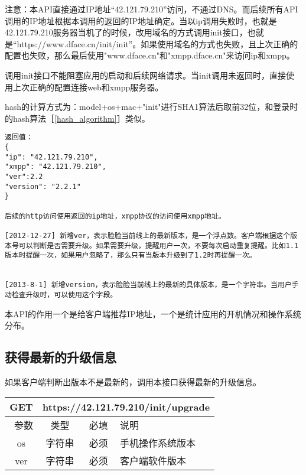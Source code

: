 \documentclass[cs4size]{ctexartutf8}
\begin{document}
注意：本API直接通过IP地址“42.121.79.210”访问，不通过DNS。而后续所有API调用的IP地址根据本调用的返回的IP地址确定。当以ip调用失败时，也就是42.121.79.210服务器当机了的时候，改用域名的方式调用init接口，也就是“https://www.dface.cn/init/init”。如果使用域名的方式也失败，且上次正确的配置也失败，那么最后使用"www.dface.cn"和"xmpp.dface.cn"来访问ip和xmpp。

调用init接口不能阻塞应用的启动和后续网络请求。当init调用未返回时，直接使用上次正确的配置连接web和xmpp服务器。

hash的计算方式为：model+os+mac+"init"进行SHA1算法后取前32位，和登录时的hash算法［\ref{hash_algorithm}］类似。

\begin{verbatim}
返回值：
{
"ip": "42.121.79.210",
"xmpp": "42.121.79.210",
"ver":2.2
"version": "2.2.1"
}

后续的http访问使用返回的ip地址，xmpp协议的访问使用xmpp地址。

[2012-12-27] 新增ver，表示脸脸当前线上的最新版本，是一个浮点数。客户端根据这个版本号可以判断是否需要升级。如果需要升级，提醒用户一次，不要每次启动重复提醒。比如1.1版本时提醒一次，如果用户忽略了，那么只有当版本升级到了1.2时再提醒一次。


[2013-8-1] 新增version，表示脸脸当前线上的最新的具体版本，是一个字符串。当用户手动检查升级时，可以使用这个字段。

\end{verbatim}

本API的作用一个是给客户端推荐IP地址，一个是统计应用的开机情况和操作系统分布。


\subsection{获得最新的升级信息}

如果客户端判断出版本不是最新的，调用本接口获得最新的升级信息。
\begin{table}[H]
   \begin{center}
\begin{tabular}{|c|c|c|p{12cm}|}
\hline
GET & \multicolumn{3}{|c|}{https://42.121.79.210/init/upgrade} \\
\hline\hline
 \  参数  & 类型 & 必填 &  说明  \\
 \hline
 os  & 字符串 & 必须 &  手机操作系统版本\\
 \hline
 ver  & 字符串 & 必须 &  客户端软件版本\\
\hline
\end{tabular}
   \end{center}
\end{table}
\end{document}
